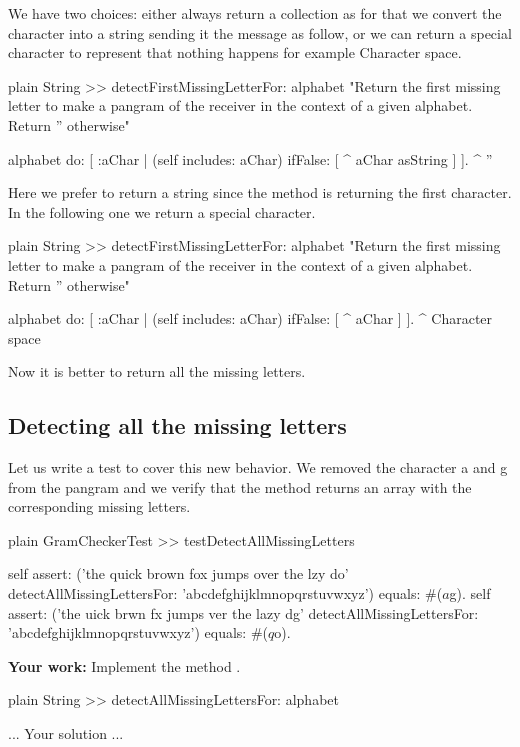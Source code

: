 \documentclass[10pt,twoside,english]{_support/latex/sbabook/sbabook}
\begin{document}
We have two choices: either always return  a collection as for that we convert the character into a string sending it the message  as follow, or we can return a special character to represent that nothing happens for example Character space. 

\begin{displaycode}{plain}
String >> detectFirstMissingLetterFor: alphabet
	"Return the first missing letter to make a pangram of the receiver in the context of a given alphabet. 
	Return '' otherwise"
	
	alphabet do: [ :aChar |
		(self includes: aChar)
			ifFalse: [ ^ aChar asString ]
		].
	^ ''
\end{displaycode}

Here we prefer to return a string since the method is returning the first character. 
In the following one we return a special character. 

\begin{displaycode}{plain}
String >> detectFirstMissingLetterFor: alphabet
	"Return the first missing letter to make a pangram of the receiver in the context of a given alphabet. 
	Return '' otherwise"
	
	alphabet do: [ :aChar |
		(self includes: aChar)
			ifFalse: [ ^ aChar ]
		].
	^ Character space
\end{displaycode}

Now it is better to return all the missing letters. 
\subsection{Detecting all the missing letters}
Let us write a test to cover this new behavior. We removed the character a and g from the pangram and we verify that the method returns an array with the corresponding missing letters. 

\begin{displaycode}{plain}
GramCheckerTest >> testDetectAllMissingLetters

	self assert: ('the quick brown fox jumps over the lzy do' 
		detectAllMissingLettersFor: 'abcdefghijklmnopqrstuvwxyz') equals: #($a $g).
	self assert: ('the uick brwn fx jumps ver the lazy dg' 
		detectAllMissingLettersFor: 'abcdefghijklmnopqrstuvwxyz') equals: #($q $o).
\end{displaycode}

\textbf{Your work:} Implement the method .

\begin{displaycode}{plain}
String >> detectAllMissingLettersFor: alphabet
	
	... Your solution ...
\end{displaycode}
\end{document}
